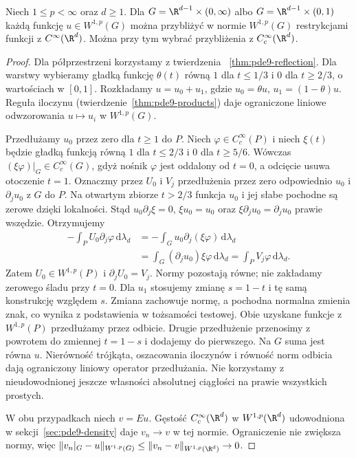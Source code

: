 \begin{lemat}
\label{lem:pde9-density-halfspace-slab}
Niech $1\le p<\infty$ oraz $d\ge1$. Dla
$G=\R^{d-1}\times(0,\infty)$ albo
$G=\R^{d-1}\times(0,1)$ każdą funkcję $u\in W^{1,p}(G)$
można przybliżyć w normie $W^{1,p}(G)$ restrykcjami funkcji
z $C^\infty(\R^d)$. Można przy tym wybrać przybliżenia
z $C_c^\infty(\R^d)$.
\end{lemat}
\begin{proof}
Dla półprzestrzeni korzystamy z twierdzenia
~\ref{thm:pde9-reflection}. Dla warstwy wybieramy
gładką funkcję $\theta(t)$ równą $1$ dla $t\le1/3$
i $0$ dla $t\ge2/3$, o wartościach w $[0,1]$.
Rozkładamy $u=u_0+u_1$, gdzie $u_0=\theta u$,
$u_1=(1-\theta)u$. Reguła iloczynu
(twierdzenie~\ref{thm:pde9-products}) daje ograniczone
liniowe odwzorowania $u\mapsto u_i$ w $W^{1,p}(G)$.

Przedłużamy $u_0$ przez zero dla $t\ge1$ do $P$.
Niech $\varphi\in C_c^\infty(P)$ i niech $\xi(t)$
będzie gładką funkcją równą $1$ dla $t\le2/3$
i $0$ dla $t\ge5/6$. Wówczas
$(\xi\varphi)|_G\in C_c^\infty(G)$, gdyż nośnik
$\varphi$ jest oddalony od $t=0$, a odcięcie
usuwa otoczenie $t=1$. Oznaczmy przez $U_0$ i $V_j$
przedłużenia przez zero odpowiednio $u_0$ i
$\partial_j u_0$ z $G$ do $P$.
Na otwartym zbiorze $t>2/3$ funkcja $u_0$
i jej słabe pochodne są zerowe dzięki lokalności.
Stąd $u_0\partial_j\xi=0$, $\xi u_0=u_0$
oraz $\xi\partial_j u_0=\partial_j u_0$ prawie wszędzie.
Otrzymujemy
\[
 \begin{aligned}
 -\int_P U_0\partial_j\varphi\,\mathrm d\lambda_d
 &=-\int_G u_0\partial_j(\xi\varphi)\,\mathrm d\lambda_d\\
 &=\int_G(\partial_j u_0)\xi\varphi\,\mathrm d\lambda_d
 =\int_P V_j\varphi\,\mathrm d\lambda_d.
 \end{aligned}
\]
Zatem $U_0\in W^{1,p}(P)$ i $\partial_j U_0=V_j$.
Normy pozostają równe; nie zakładamy zerowego śladu
przy $t=0$. Dla $u_1$ stosujemy zmianę $s=1-t$
i tę samą konstrukcję względem $s$. Zmiana zachowuje
normę, a pochodna normalna zmienia znak, co wynika
z podstawienia w tożsamości testowej.
Obie uzyskane funkcje z $W^{1,p}(P)$ przedłużamy
przez odbicie. Drugie przedłużenie przenosimy
z powrotem do zmiennej $t=1-s$ i dodajemy do pierwszego.
Na $G$ suma jest równa $u$. Nierówność trójkąta,
oszacowania iloczynów i równość norm odbicia dają
ograniczony liniowy operator przedłużania.
Nie korzystamy z nieudowodnionej jeszcze własności
absolutnej ciągłości na prawie wszystkich prostych.

W obu przypadkach niech $v=Eu$. Gęstość
$C_c^\infty(\R^d)$ w $W^{1,p}(\R^d)$ udowodniona
w sekcji~\ref{sec:pde9-density} daje $v_n\to v$
w tej normie. Ograniczenie nie zwiększa normy,
więc $\|v_n|_G-u\|_{W^{1,p}(G)}
\le\|v_n-v\|_{W^{1,p}(\R^d)}\to0$.
\end{proof}


